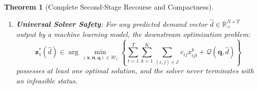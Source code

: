 \documentclass[11pt,a4paper]{article}
\newtheorem{theorem}{Theorem}
\theoremstyle{definition}
\theoremstyle{remark}
\begin{document}
\begin{theorem}[Complete Second-Stage Recourse and Compactness]
\begin{enumerate}[label=(\roman*)]
    \begin{equation*}
        0 \le \mathcal{Q}(\mathbf{q}, \tilde{d}) \le \sum_{t=1}^T \sum_{i=1}^N \left[ p_u \tilde{d}_{i,t} + (h_{\tau-1} \tau + p_s) q_{it} \right] + \sum_{i=1}^N (h_{\tau-1} \tau + p_s) \sum_{a=1}^{\tau-1} I_{i,0,a} < +\infty.
    \end{equation*}
    \item \textbf{Universal Solver Safety}: For any predicted demand vector $\hat{d} \in \mathbb{R}_+^{N \times T}$ output by a machine learning model, the downstream optimization problem:
    \begin{equation*}
        \mathbf{z}_1^*(\hat{d}) \in \arg\min_{(\mathbf{x}, \mathbf{u}, \mathbf{q}) \in \mathcal{W}_1} \left\{ \sum_{t=1}^T \sum_{k=1}^K \sum_{(i,j) \in \mathcal{E}} c_{ij} x_{ijt}^k + \mathcal{Q}(\mathbf{q}, \hat{d}) \right\}
    \end{equation*}
    possesses at least one optimal solution, and the solver never terminates with an infeasible status.
\end{enumerate}
\end{theorem}
\end{document}

